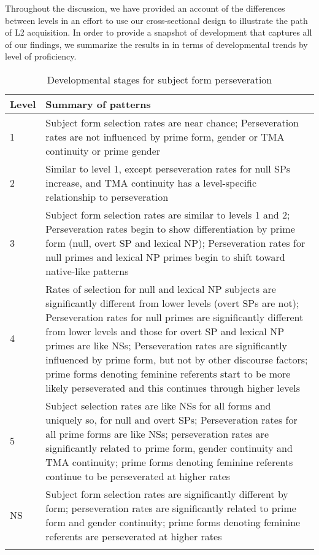 \documentclass[output=paper]{langscibook}
\begin{document}
Throughout the discussion, we have provided an account of the differences between levels in an effort to use our cross-sectional design to illustrate the path of L2 acquisition. In order to provide a snapshot of development that captures all of our findings, we summarize the results in  in terms of developmental trends by level of proficiency.
\vfill
\begin{table}[H]
\begin{tabularx}{\textwidth}{lQ}
\lsptoprule
 {Level} & {Summary of patterns}\\
 \midrule
 {1} & {Subject form selection rates are near chance; Perseveration rates are not influenced by prime form, gender or TMA continuity or prime gender} \\
 \midrule
 {2} & {Similar to level 1, except perseveration rates for null SPs increase, and TMA continuity has a level-specific relationship to perseveration}\\
 \midrule
 {3} & {Subject form selection rates are similar to levels 1 and 2; Perseveration rates begin to show differentiation by prime form (null, overt SP and lexical NP); Perseveration rates for null primes and lexical NP primes begin to shift toward native-like patterns}\\
 \midrule
 {4} & {Rates of selection for null and lexical NP subjects are significantly different from lower levels (overt SPs are not); Perseveration rates for null primes are significantly different from lower levels and those for overt SP and lexical NP primes are like NSs; Perseveration rates are significantly influenced by prime form, but not by other discourse factors; prime forms denoting feminine referents start to be more likely perseverated and this continues through higher levels}\\
 \midrule
 {5} & {Subject selection rates are like NSs for all forms and uniquely so, for null and overt SPs; Perseveration rates for all prime forms are like NSs; perseveration rates are significantly related to prime form, gender continuity and TMA continuity; prime forms denoting feminine referents continue to be perseverated at higher rates}\\
 \midrule
 {NS} & {Subject form selection rates are significantly different by form; perseveration rates are significantly related to prime form and gender continuity; prime forms denoting feminine referents are perseverated at higher rates}\\
\lspbottomrule
\end{tabularx}
\caption{Developmental stages for subject form perseveration}
\label{tab:geeslin:11}
\end{table}\vfill\pagebreak
\end{document}
